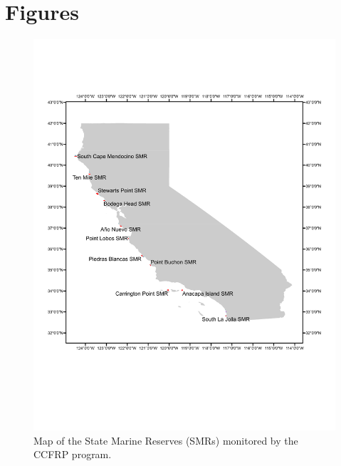 \documentclass[
]{article}
\begin{document}
\FloatBarrier

\hypertarget{figures}{%
\section{Figures}\label{figures}}

\begin{figure}
\centering
\includegraphics{MPA_map.pdf}
\caption{\label{fig:fig-mpa-map}Map of the State Marine Reserves (SMRs) monitored by the CCFRP program.}
\end{figure}
\end{document}
